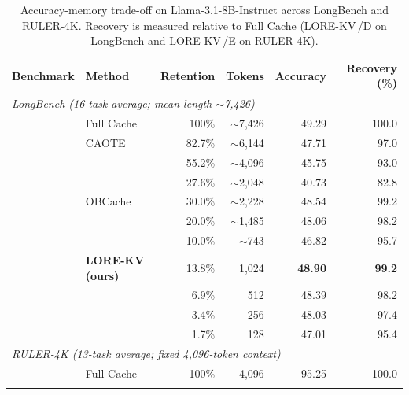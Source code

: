 \documentclass{article} %
\newcommand{\best}[1]{\textcolor{bestblue}{\textbf{#1}}}
\newcommand{\second}[1]{\textcolor{secondorange}{#1}}
\newcommand{\lorekvE}{LORE-KV\,/E}
\newcommand{\lorekvD}{LORE-KV\,/D}
\begin{document}
\begin{table}[t]
\color{purple}
\centering
\caption{Accuracy-memory trade-off on Llama-3.1-8B-Instruct across LongBench and RULER-4K. Recovery is measured relative to Full Cache (\lorekvD{} on LongBench and \lorekvE{} on RULER-4K).}
\label{tab:external_comparison}

\small
\setlength{\tabcolsep}{7pt}
\renewcommand{\arraystretch}{1.05}

\begin{tabular}{@{}llrrrr@{}}
\toprule
Benchmark & Method & Retention & Tokens & Accuracy & Recovery (\%) \\
\midrule

\multicolumn{6}{l}{\textit{LongBench (16-task average; mean length $\sim$7,426)}} \\
\addlinespace[1pt]

& Full Cache
& 100\% & $\sim$7,426 & 49.29 & 100.0 \\

\addlinespace[2pt]

& CAOTE
& 82.7\% & $\sim$6,144 & 47.71 & 97.0 \\
&
& 55.2\% & $\sim$4,096 & 45.75 & 93.0 \\
&
& 27.6\% & $\sim$2,048 & 40.73 & 82.8 \\

\addlinespace[2pt]

& OBCache
& 30.0\% & $\sim$2,228 & \second{48.54} & \second{99.2} \\
&
& 20.0\% & $\sim$1,485 & 48.06 & 98.2 \\
&
& 10.0\% & $\sim$743 & 46.82 & 95.7 \\

\addlinespace[2pt]

& \textbf{LORE-KV (ours)}
& 13.8\% & 1,024 & \best{48.90} & \best{99.2} \\
&
& 6.9\% & 512 & 48.39 & 98.2 \\
&
& 3.4\% & 256 & 48.03 & 97.4 \\
&
& 1.7\% & 128 & 47.01 & 95.4 \\

\midrule

\multicolumn{6}{l}{\textit{RULER-4K (13-task average; fixed 4,096-token context)}} \\
\addlinespace[1pt]

& Full Cache
& 100\% & 4,096 & 95.25 & 100.0 \\

\addlinespace[2pt]


\end{tabular}
\end{table}
\end{document}
